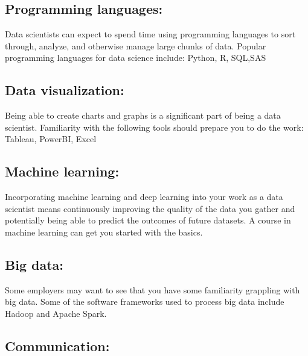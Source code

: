 \documentclass[
]{book}
\begin{document}
\hypertarget{programming-languages}{%
\subsection*{Programming languages:}\label{programming-languages}}

Data scientists can expect to spend time using programming languages to sort through, analyze, and otherwise manage large chunks of data. Popular programming languages for data science include: Python, R, SQL,SAS

\hypertarget{data-visualization}{%
\subsection*{Data visualization:}\label{data-visualization}}

Being able to create charts and graphs is a significant part of being a data scientist. Familiarity with the following tools should prepare you to do the work:
Tableau, PowerBI, Excel

\hypertarget{machine-learning}{%
\subsection*{Machine learning:}\label{machine-learning}}

Incorporating machine learning and deep learning into your work as a data scientist means continuously improving the quality of the data you gather and potentially being able to predict the outcomes of future datasets. A course in machine learning can get you started with the basics.

\hypertarget{big-data}{%
\subsection*{Big data:}\label{big-data}}

Some employers may want to see that you have some familiarity grappling with big data. Some of the software frameworks used to process big data include Hadoop and Apache Spark.

\hypertarget{communication}{%
\subsection*{Communication:}\label{communication}}
\end{document}
